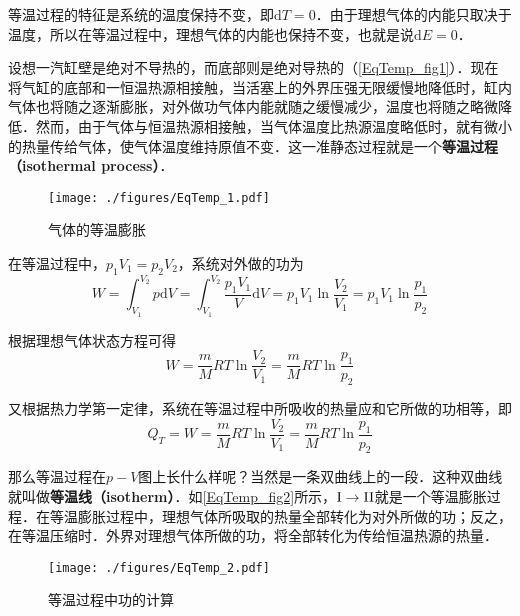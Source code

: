 

等温过程的特征是系统的温度保持不变，即$\mathrm dT=0$．由于理想气体的内能只取决于温度，所以在等温过程中，理想气体的内能也保持不变，也就是说$\mathrm dE=0$．

设想一汽缸壁是绝对不导热的，而底部则是绝对导热的（\autoref{EqTemp_fig1}）．现在将气缸的底部和一恒温热源相接触，当活塞上的外界压强无限缓慢地降低时，缸内气体也将随之逐渐膨胀，对外做功气体内能就随之缓慢减少，温度也将随之略微降低．然而，由于气体与恒温热源相接触，当气体温度比热源温度略低时，就有微小的热量传给气体，使气体温度维持原值不变．这一准静态过程就是一个\textbf{等温过程（isothermal process）}．
\begin{figure}[ht]
\centering
\texttt{[image: ./figures/EqTemp\_1.pdf]}
\caption{气体的等温膨胀} \label{EqTemp_fig1}
\end{figure}

在等温过程中，$p_1V_1=p_2V_2$，系统对外做的功为
\begin{equation}
W= \int_{V_{1}}^{V_{2}} p \mathrm{d} V=\int_{V_{1}}^{V_{2}} \frac{p_{1} V_{1}}{V} \mathrm{d} V=p_{1} V_{1} \ln \frac{V_{2}}{V_{1}}=p_{1} V_{1} \ln \frac{p_{1}}{p_{2}}
\end{equation}

根据理想气体状态方程可得
\begin{equation}
W=\frac{m}{M} R T \ln \frac{V_{2}}{V_{1}}=\frac{m}{M} R T \ln \frac{p_{1}}{p_{2}}
\end{equation}

又根据热力学第一定律，系统在等温过程中所吸收的热量应和它所做的功相等，即
\begin{equation}
Q_{T}=W=\frac{m}{M} R T \ln \frac{V_{2}}{V_{1}}=\frac{m}{M} R T \ln \frac{p_{1}}{p_{2}}
\end{equation}

那么等温过程在$p-V$图上长什么样呢？当然是一条双曲线上的一段．这种双曲线就叫做\textbf{等温线（isotherm）}．如\autoref{EqTemp_fig2}所示，$\rm I\to II$就是一个等温膨胀过程．在等温膨胀过程中，理想气体所吸取的热量全部转化为对外所做的功；反之，在等温压缩时．外界对理想气体所做的功，将全部转化为传给恒温热源的热量．

\begin{figure}[ht]
\centering
\texttt{[image: ./figures/EqTemp\_2.pdf]}
\caption{等温过程中功的计算} \label{EqTemp_fig2}
\end{figure} 